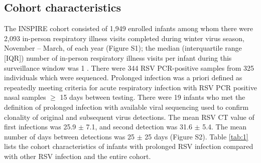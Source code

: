 \documentclass[9pt,lineno]{elife}  %
\begin{document}
\subsection{Cohort characteristics}
The INSPIRE cohort consisted of 1,949 enrolled infants among whom there were 2,093 in-person respiratory illness visits completed during winter virus season, November – March, of each year (Figure S1); the median (interquartile range [IQR]) number of in-person respiratory illness visits per infant during this surveillance window was 1 
\citep{lawless2020genome, hall_burden_2009}.
There were 344 RSV PCR-positive samples from 325 individuals which were sequenced. 
Prolonged infection was a priori defined as repeatedly meeting criteria for acute respiratory infection with RSV PCR positive nasal samples $\ge$ 15 days between testing. 
There were 19 infants who met the definition of prolonged infection with available viral sequencing used to confirm clonality of original and subsequent virus detections. 
The mean RSV CT value of first infections was 25.9 $\pm$ 7.1, and second detection was 31.6 $\pm$ 5.4. 
The mean number of days between detections was 25 $\pm$ 25 days (Figure S2). Table \ref{tab:1} lists the cohort characteristics of infants with prolonged RSV infection compared with other RSV infection and the entire cohort.
 
\end{document}

